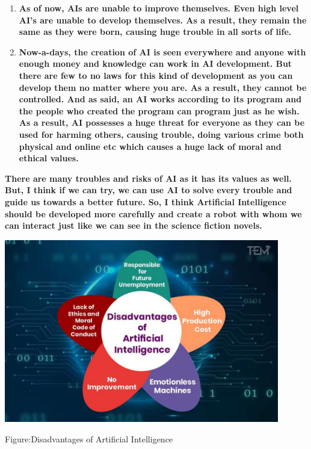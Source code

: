 \documentclass{article}
\begin{document}
\noindent 


\begin{enumerate}
\item  \textbf{ As of now, AIs are unable to improve themselves. Even high level AI's are unable to develop themselves. As a result, they remain the same as they were born, causing huge trouble in all sorts of life.~\underbar{}}

\item \textbf{ Now-a-days, the creation of AI is seen everywhere and anyone with enough money and knowledge can work in AI development. But there are few to no laws for this kind of development as you can develop them no matter where you are. As a result, they cannot be controlled. And as said, an AI works according to its program and the people who created the program can program just as he wish. As a result, AI possesses a huge threat for everyone as they can be used for harming others, causing trouble, doing various crime both physical and online etc which causes a huge lack of moral and ethical values.\underbar{}}
\end{enumerate}

\noindent 

\noindent \textbf{There are many troubles and risks of AI as it has its values as well. But, I think if we can try, we can use AI to solve every trouble and guide us towards a better future. So, I think Artificial Intelligence should be developed more carefully and create a robot with whom we can interact just like we can see in the science fiction novels.}
\linebreak

\noindent 


 \includegraphics[width=12cm]{Disadvantages of Artificial Intelligence.jpg}\par 
 \centering
 \bf\large\caption{ Figure:Disadvantages of Artificial Intelligence}
 \noindent
 \newpage
 
\end{document}
